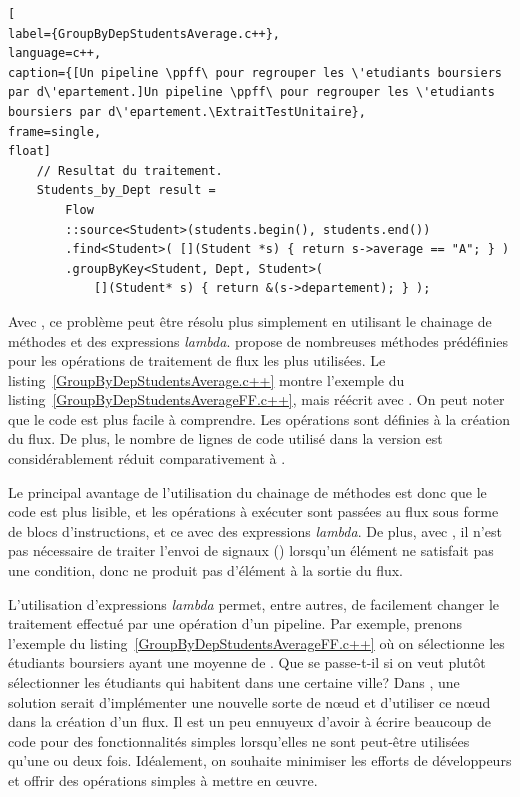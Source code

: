 \begin{lstlisting}[
label={GroupByDepStudentsAverage.c++},
language=c++,
caption={[Un pipeline \ppff\ pour regrouper les \'etudiants boursiers par d\'epartement.]Un pipeline \ppff\ pour regrouper les \'etudiants boursiers par d\'epartement.\ExtraitTestUnitaire},
frame=single,
float]
    // Resultat du traitement.
    Students_by_Dept result = 
        Flow
        ::source<Student>(students.begin(), students.end())
        .find<Student>( [](Student *s) { return s->average == "A"; } )
        .groupByKey<Student, Dept, Student>(
            [](Student* s) { return &(s->departement); } );        
\end{lstlisting}

Avec , ce probl\`eme peut \^etre r\'esolu plus simplement en utilisant le chainage de m\'ethodes et des expressions \emph{lambda}.  propose de nombreuses m\'ethodes pr\'ed\'efinies pour les op\'erations de traitement de flux les plus utilis\'ees. Le listing~\ref{GroupByDepStudentsAverage.c++} montre l'exemple du listing~\ref{GroupByDepStudentsAverageFF.c++}, mais r\'e\'ecrit avec . On peut noter que le code est plus facile \`a comprendre. Les op\'erations sont définies \`a la cr\'eation du flux. De plus, le nombre de lignes de code utilis\'e dans la version  est consid\'erablement r\'eduit comparativement \`a . 

Le principal avantage de l'utilisation du chainage de m\'ethodes est donc que le code est plus lisible, et les op\'erations à exécuter sont pass\'ees au flux sous forme de blocs d'instructions, et ce avec des expressions \emph{lambda}.
%
De plus, avec , il n'est pas nécessaire de traiter l'envoi de
signaux () lorsqu'un élément ne satisfait pas une
condition, donc ne produit pas d'élément à la sortie du flux.




L'utilisation d'expressions \emph{lambda} permet, entre autres, de
facilement changer le traitement effectué par une opération d'un
pipeline.
%
Par exemple, prenons l'exemple du listing~\ref{GroupByDepStudentsAverageFF.c++} o\`u on sélectionne les \'etudiants boursiers ayant une moyenne de . Que se passe-t-il si on veut plutôt sélectionner les \'etudiants qui habitent dans une certaine ville? Dans , une solution serait d'impl\'ementer une nouvelle sorte de nœud et d'utiliser ce n\oe{}ud dans la cr\'eation d'un flux. 
%
Il est un peu ennuyeux d'avoir \`a \'ecrire beaucoup de code pour des fonctionnalit\'es simples lorsqu'elles ne sont peut-\^etre utilis\'ees qu'une ou deux fois. Id\'ealement, on souhaite minimiser les efforts de d\'eveloppeurs et offrir des op\'erations simples \`a mettre en œuvre.


